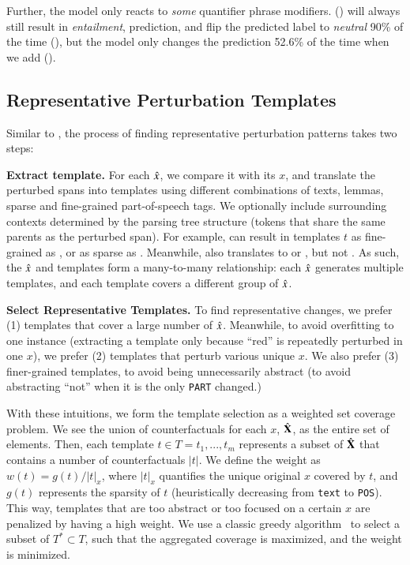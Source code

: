 Further, the model only reacts to \emph{some} quantifier phrase modifiers. 
 () will always still result in \emph{entailment}, prediction,  and  flip the predicted label to \emph{neutral} 90\% of the time (), but the model only changes the prediction 52.6\% of the time when we add  ().


\subsection{Representative Perturbation Templates}
\label{appendix:err_analysis_template}

Similar to \citet{wu2020tempura}, the process of finding representative perturbation patterns takes two steps:

\textbf{Extract template.}
For each $\hat{x}$, we compare it with its $x$, and translate the perturbed spans into templates using different combinations of texts, lemmas, sparse and fine-grained part-of-speech tags.
We optionally include surrounding contexts determined by the parsing tree structure (tokens that share the same parents as the perturbed span).
For example,  can result in templates $t$ as fine-grained as , or as sparse as .
Meanwhile,  also translates to  or , but not .
As such, the $\hat{x}$ and templates form a many-to-many relationship: each $\hat{x}$ generates multiple templates, and each template covers a different group of $\hat{x}$.

\textbf{Select Representative Templates.}
To find representative changes, we prefer (1) templates that cover a large number of $\hat{x}$.
Meanwhile, to avoid overfitting to one instance (\eg extracting a template  only because ``red'' is repeatedly perturbed in one $x$), we prefer (2) templates that perturb various unique $x$.
We also prefer (3) finer-grained templates, to avoid being unnecessarily abstract (\eg to avoid abstracting ``not'' when it is the only \texttt{PART} changed.)


With these intuitions, we form the template selection as a weighted set coverage problem.
We see the union of counterfactuals for each $x$, $\hat{\mathbf{X}}$, as the entire set of elements.
Then, each template $t \in T = {t_1,...,t_m}$ represents a subset of $\hat{\mathbf{X}}$ that contains a number of counterfactuals $|t|$.
We define the weight as $w(t) = g(t) / |t|_x$, where $|t|_x$ quantifies the unique original $x$ covered by $t$, and $g(t)$ represents the sparsity of $t$ (heuristically decreasing from \texttt{text} to \texttt{POS}).
This way, templates that are too abstract or too focused on a certain $x$ are penalized by having a high weight. 
We use a classic greedy algorithm~\cite{vazirani2013approximation} to select a subset of $T^* \subset T$, such that the aggregated coverage is maximized, and the weight is minimized.
